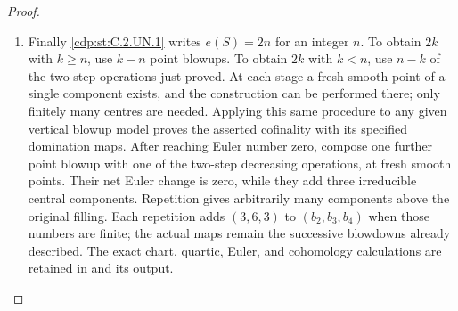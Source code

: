 \begin{proof}
\begin{enumerate}[label={$\langle1\rangle$\arabic*.},leftmargin=*]
\item Finally \ref{cdp:st:C.2.UN.1} writes $e(S)=2n$ for an integer $n$. To obtain $2k$
with $k\ge n$, use $k-n$ point blowups. To obtain $2k$ with $k<n$,
use $n-k$ of the two-step operations just proved. At each stage a
fresh smooth point of a single component exists, and the construction
can be performed there; only finitely many centres are needed.
Applying this same procedure to any given vertical blowup model
proves the asserted cofinality with its specified domination maps.
After reaching Euler number zero, compose one further point blowup
with one of the two-step decreasing operations, at fresh smooth
points. Their net Euler change is zero, while they add three
irreducible central components. Repetition gives arbitrarily many
components above the original filling. Each repetition adds
$(3,6,3)$ to $(b_2,b_3,b_4)$ when those numbers are finite; the
actual maps remain the successive blowdowns already described.
The exact chart, quartic, Euler, and cohomology calculations are
retained in  and its output.

\end{enumerate}
\end{proof}